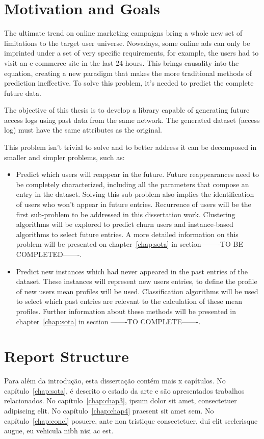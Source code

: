 \section{Motivation and Goals} \label{sec:goals}

The ultimate trend on online marketing campaigns bring a whole new set of limitations to the target user universe. Nowadays, some online ads can only
be imprinted under a set of very specific requirements, for example, the users had to visit an e-commerce site in the last 24 hours. 
This brings causality into the equation, creating a new paradigm that makes 
the more traditional methods of prediction ineffective. To solve this problem, it's needed to predict the complete future data.

The objective of this thesis is to develop a library capable of generating future access logs using past data from the same network.
The generated dataset (access log) must have the same attributes as the original.

This problem isn't trivial to solve and to better address it can be decomposed in smaller and simpler problems, such as:
\begin{itemize}
    \item Predict which users will reappear in the future. Future reappearances need to be completely characterized, including 
      all the parameters that compose an entry in the dataset. Solving this sub-problem also implies the identification of users who
      won't appear in future entries. Recurrence of users will be the first sub-problem to be addressed in this dissertation work. 
      Clustering algorithms will be explored to predict churn users and instance-based algorithms to select future entries. A more detailed information
      on this problem will be presented on chapter~\ref{chap:sota} in section -------TO BE COMPLETED-------.
    \item Predict new instances which had never appeared in the past entries of the dataset.
      These instances will represent new users entries, to define the profile of new users mean profiles will be used. Classification algorithms will be used to select 
      which past entries are relevant to the calculation of these mean profiles. Further information about these methods will be presented in
      chapter~\ref{chap:sota} in section -------TO COMPLETE-------.
\end{itemize}

\section{Report Structure} \label{sec:struct}

Para além da introdução, esta dissertação contém mais x capítulos.
No capítulo~\ref{chap:sota}, é descrito o estado da arte e são
apresentados trabalhos relacionados. 
No capítulo~\ref{chap:chap3}, ipsum dolor sit amet, consectetuer
adipiscing elit.
No capítulo~\ref{chap:chap4} praesent sit amet sem. 
No capítulo~\ref{chap:concl}  posuere, ante non tristique
consectetuer, dui elit scelerisque augue, eu vehicula nibh nisi ac
est. 
